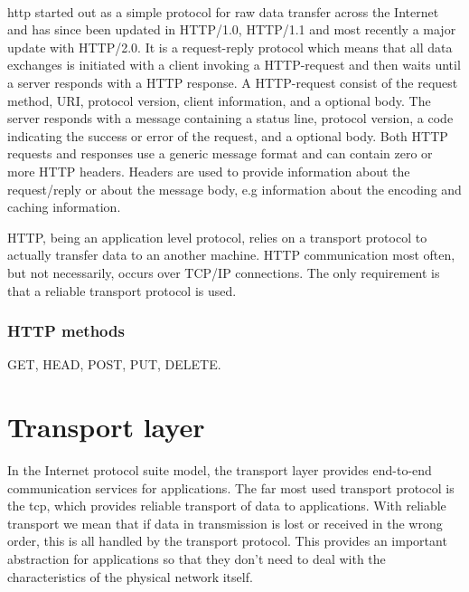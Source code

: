 \paragraph{}

\gls{http} started out as a simple protocol for raw data transfer across the
Internet and has since been updated in HTTP/1.0, HTTP/1.1 and most recently a
major update with HTTP/2.0. It is a request-reply protocol which means that all
data exchanges is initiated with a client invoking a HTTP-request and then waits
until a server responds with a HTTP response. A HTTP-request consist of the
request method, URI, protocol version, client information, and a optional body.
The server responds with a message containing a status line, protocol version, a
code indicating the success or error of the request, and a optional body. Both
HTTP requests and responses use a generic message format and can contain zero or
more HTTP headers. Headers are used to provide information about the
request/reply or about the message body, e.g information about the encoding and
caching information.

HTTP, being an application level protocol, relies on a transport protocol to
actually transfer data to an another machine. HTTP communication most often, but
not necessarily, occurs over TCP/IP connections. The only requirement is that a
reliable transport protocol is used.

\subsubsection{HTTP methods}
GET, HEAD, POST, PUT, DELETE.


\section{Transport layer}

In the Internet protocol suite model, the transport layer provides end-to-end
communication services for applications\cite{rfc-1122}. The far most used
transport protocol is the \gls{tcp}, which provides reliable transport of data
to applications. With reliable transport we mean that if data in transmission is
lost or received in the wrong order, this is all handled by the transport
protocol. This provides an important abstraction for applications so that they
don't need to deal with the characteristics of the physical network itself.

\subsection{}
\label{tcp}

